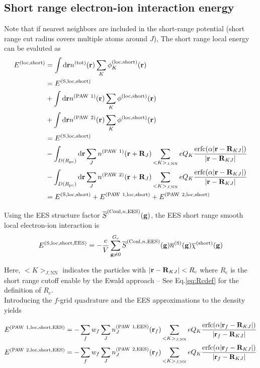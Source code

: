 \documentclass[paper=a4, fontsize=11pt]{article} %
\numberwithin{equation}{section} %
\numberwithin{figure}{section} %
\numberwithin{table}{section} %
\newcommand{\ol}{\overline}
\newcommand{\bg}{{\bf{g}}}
\newcommand{\br}{{\bf{r}}}
\newcommand{\bR}{{\bf{R}}}
\newcommand{\rS}{{\mathrm{S}}}
\newcommand{\rEES}{{\mathrm{EES}}}
\newcommand{\rNN}{{\mathrm{NN}}}
\newcommand{\rCo}{{\mathrm{Coul}}}
\newcommand{\rshort}{{\mathrm{short}}}
\newcommand{\rerfc}{{\mathrm{erfc}}}
\newcommand{\rP}{{\mathrm{PAW}}}
\newcommand{\rd}{{\mathrm{d}}}
\newcommand{\rlo}{{\mathrm{loc}}}
\newcommand{\rtot}{{\mathrm{tot}}}
\newcommand{\Rc}{{R_{\mathrm{c}}}}
\newcommand{\Gc}{{G_{\mathrm{c}}}}
\newcommand{\Rpc}{{R_{\mathrm{pc}}}}
\begin{document}
\subsection{Short range electron-ion interaction energy}
Note that if nearest neighbors are included in the short-range potential (short range cut radius covers multiple atoms around $J$), 
The short range local energy can be evaluted as
\begin{equation} \label{eq:locshort}
\begin{split}
E^{(\rlo,\rshort)}
&= \int \rd \br n^{(\rtot)}(\br) \sum_K\phi_K^{(\rlo,\rshort)}(\br)\\
&= E^{(\rS,\rlo,\rshort)} \\
& + \int \rd\br n^{(\rP\ 1)}(\br)\sum_K\phi^{(\rlo,\rshort)}(\br)\\
& + \int \rd\br  n^{(\rP\ 2)}(\br) \sum_K\phi^{(\rlo,\rshort)}(\br)\\
&= E^{(\rS,\rlo,\rshort)} \\
& - \int_{D(\Rpc)} \rd\br \sum_J n^{(\rP\ 1)}(\br+\bR_J)\sum_{<K>_{J,\rNN}}eQ_K\frac{\rerfc(\alpha|\br-\bR_{KJ}|)}{|\br-\bR_{KJ}|} \\
&- \int_{D(\Rpc)} \rd\br \sum_J n^{(\rP\ 2)}(\br+\bR_J)\sum_{<K>_{J,\rNN}}eQ_K\frac{\rerfc(\alpha|\br-\bR_{KJ}|)}{|\br-\bR_{KJ}|} \\
&= E^{(\rS,\rlo,\rshort)} + E^{(\rP\ 1,\rlo,\rshort)} + E^{(\rP\ 2,\rlo,\rshort)}
\end{split}
\end{equation}

Using the EES structure factor $\ol S^{(\rCo,n,\rEES)}(\bg)$, the EES short range smooth local electron-ion interaction is
\begin{equation}
E^{(\rS,\rlo,\rshort,\rEES)} = -\frac{e}{V}\sum_{\bg \neq 0}^\Gc \ol S^{(\rCo,n,\rEES)}(\bg)\overline{n}^{(\rS)}(\bg) \ol \chi^{(\rshort)}(\bg)
\end{equation}

Here, $<K>_{J,\rNN}$ indicates the particles with $|\br-\bR_{KJ}| < \Rc$ where $\Rc$ is the short range cutoff enable by the Ewald approach -- See Eq.\eqref{eq:Rcdef} for the definition of $\Rc$.\\

Introducing the $f$-grid quadrature and the EES approximations to the density yields

\begin{equation} \label{eq:locshortEES12}
\begin{split}
E^{(\rP\ 1,\rlo,\rshort,\rEES)}
&= - \sum_f w_f \sum_J n_J^{(\rP\ 1,\rEES)}(\br_f)\sum_{<K>_{J,\rNN}}eQ_K\frac{\rerfc(\alpha|\br_f-\bR_{KJ}|)}{|\br_f-\bR_{KJ}|} \\
E^{(\rP\ 2,\rlo,\rshort,\rEES)}
&= - \sum_f w_f \sum_J n_J^{(\rP\ 2,\rEES)}(\br_f)\sum_{<K>_{J,\rNN}}eQ_K\frac{\rerfc(\alpha|\br_f-\bR_{KJ}|)}{|\br_f-\bR_{KJ}|} \\
\end{split}
\end{equation}
\end{document}
